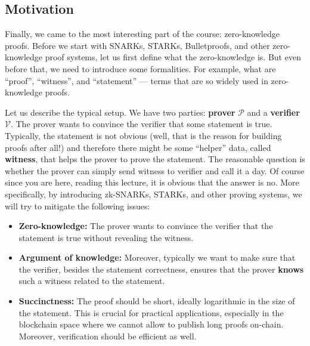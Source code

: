 \documentclass[../../book.tex]{subfiles}
\begin{document}
\subsection{Motivation}

Finally, we came to the most interesting part of the course: zero-knowledge
proofs. Before we start with SNARKs, STARKs, Bulletproofs, and other
zero-knowledge proof systems, let us first define what the zero-knowledge is.
But even before that, we need to introduce some formalities. For example, what
are ``proof'', ``witness'', and ``statement'' --- terms that are so widely used
in zero-knowledge proofs.

Let us describe the typical setup. We have two parties: \textbf{prover}
$\mathcal{P}$ and a \textbf{verifier} $\mathcal{V}$. The prover wants to
convince the verifier that some statement is true. Typically, the statement is
not obvious (well, that is the reason for building proofs after all!) and
therefore there might be some ``helper'' data, called \textbf{witness}, that
helps the prover to prove the statement. The reasonable question is whether the
prover can simply send witness to verifier and call it a day. Of course since
you are here, reading this lecture, it is obvious that the answer is no. More
specifically, by introducing zk-SNARKs, STARKs, and other proving systems, we
will try to mitigate the following issues:

\vspace{2mm}

\begin{itemize}
    \item \textbf{Zero-knowledge:} The prover wants to convince the verifier
    that the statement is true without revealing the witness. 
    \item \textbf{Argument of knowledge:} Moreover, typically we want to make
    sure that the verifier, besides the statement correctness, ensures that the
    prover \textbf{knows} such a witness related to the statement.
    \item \textbf{Succinctness:} The proof should be short, ideally logarithmic
    in the size of the statement. This is crucial for practical applications,
    especially in the blockchain space where we cannot allow to publish long
    proofs on-chain. Moreover, verification should be efficient as well.
\end{itemize}
\end{document}
